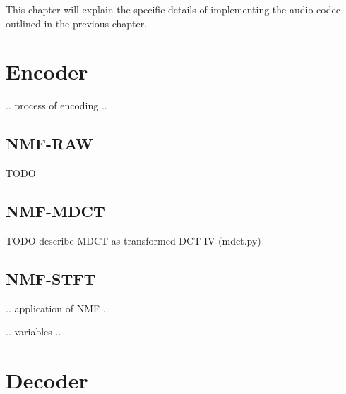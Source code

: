 This chapter will explain the specific details of implementing the audio codec outlined in the previous chapter.

\section{Encoder}
.. process of encoding ..

\subsection{NMF-RAW}
TODO

\subsection{NMF-MDCT}
TODO describe MDCT as transformed DCT-IV (mdct.py)

\subsection{NMF-STFT}

.. application of NMF ..

.. variables ..

\section{Decoder}